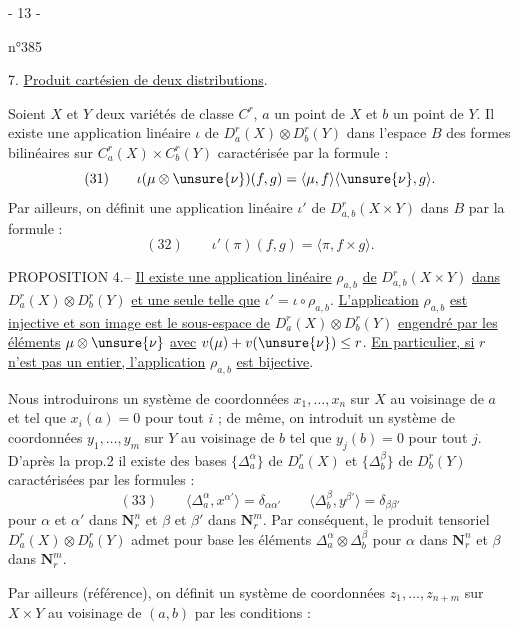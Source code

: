 \begin{center}- 13 -\end{center}
\begin{flushright}n°385\end{flushright}
7. \uline{Produit cartésien de deux distributions}.

Soient $X$ et $Y$ deux variétés de classe $C^r$, $a$ un point de $X$ et $b$ un point de $Y$.
Il existe une application linéaire $\iota$ de $D_a^r(X)\otimes D_b^r(Y)$ dans l'espace $B$ des formes bilinéaires sur $C_a^r(X)\times C_b^r(Y)$ caractérisée par la formule :
\[
(31)\qquad \iota(\mu\otimes\unsure{\nu})(f,g)=\langle\mu,f\rangle\langle\unsure{\nu},g\rangle.
\]
Par ailleurs, on définit une application linéaire $\iota'$ de $D_{a,b}^r(X\times Y)$ dans $B$ par la formule :
\[
(32)\qquad \iota'(\pi)(f,g)=\langle\pi,f\times g\rangle.
\]

PROPOSITION 4.-- \uline{Il existe une application linéaire} $\rho_{a,b}$ \uline{de} $D_{a,b}^r(X\times Y)$ \uline{dans} $D_a^r(X)\otimes D_b^r(Y)$ \uline{et une seule telle que} $\iota'=\iota\circ\rho_{a,b}$. \uline{L'application} $\rho_{a,b}$ \uline{est injective et son image est le sous-espace de} $D_a^r(X)\otimes D_b^r(Y)$ \uline{engendré par les éléments} $\mu\otimes\unsure{\nu}$ \uline{avec} $v(\mu)+v(\unsure{\nu})\leq r$. \uline{En particulier, si} $r$ \uline{n'est pas un entier, l'application} $\rho_{a,b}$ \uline{est bijective}.

Nous introduirons un système de coordonnées $x_1,\ldots,x_n$ sur $X$ au voisinage de $a$ et tel que $x_i(a)=0$ pour tout $i$ ; de même, on introduit un système de coordonnées $y_1,\ldots,y_m$ sur $Y$ au voisinage de $b$ tel que $y_j(b)=0$ pour tout $j$. D'après la prop.2 il existe des bases $\{\Delta_a^\alpha\}$ de $D_a^r(X)$ et $\{\Delta_b^\beta\}$ de $D_b^r(Y)$ caractérisées par les formules :
\[
(33)\qquad
\langle\Delta_a^\alpha,x^{\alpha'}\rangle=\delta_{\alpha\alpha'}
\qquad
\langle\Delta_b^\beta,y^{\beta'}\rangle=\delta_{\beta\beta'}
\]
pour $\alpha$ et $\alpha'$ dans $\mathbf{N}_r^n$ et $\beta$ et $\beta'$ dans $\mathbf{N}_r^m$. Par conséquent, le produit tensoriel $D_a^r(X)\otimes D_b^r(Y)$ admet pour base les éléments $\Delta_a^\alpha\otimes\Delta_b^\beta$ pour $\alpha$ dans $\mathbf{N}_r^n$ et $\beta$ dans $\mathbf{N}_r^m$.

Par ailleurs (référence), on définit un système de coordonnées $z_1,\ldots,z_{n+m}$ sur $X\times Y$ au voisinage de $(a,b)$ par les conditions :
